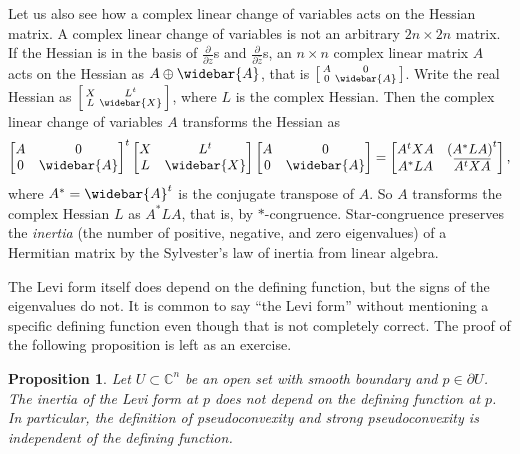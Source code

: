 \documentclass[12pt,openany]{book}
\newcommand{\C}{{\mathbb{C}}}
\newcommand{\myindex}[1]{#1\index{#1}}
\theoremstyle{plain}
\newtheorem{prop}[thm]{Proposition}
\theoremstyle{remark}
\theoremstyle{definition}
\theoremstyle{exercise}
\theoremstyle{example}
\begin{document}
Let us also see how a complex linear change of variables
acts on the Hessian matrix.  A complex linear change of variables is not an
arbitrary $2n \times 2n$ matrix.  If the Hessian is in the 
basis of $\frac{\partial}{\partial z}$s and
$\frac{\partial}{\partial \bar{z}}$s, an $n \times n$ complex linear matrix $A$
acts on the Hessian as $A \oplus \widebar{A}$, that is
$\left[ \begin{smallmatrix} A & 0 \\ 0 & \widebar{A} \end{smallmatrix}
\right]$.
Write the real Hessian as
$\left[ \begin{smallmatrix} X & L^t \\ L & \widebar{X} \end{smallmatrix}
\right]$, where $L$ is the complex Hessian.  Then the complex linear change
of variables $A$ transforms
the Hessian as
\begin{equation*}
{\begin{bmatrix} A & 0 \\ 0 & \widebar{A} \end{bmatrix}}^t
\begin{bmatrix} X & L^t \\ L & \widebar{X} \end{bmatrix}
\begin{bmatrix} A & 0 \\ 0 & \widebar{A} \end{bmatrix}
=
\begin{bmatrix} A^tXA & {(A^*LA)}^t \\ A^*LA & \overline{A^tXA} \end{bmatrix} ,
\end{equation*}
%
where $A^* = \widebar{A}^t$ is the conjugate
transpose of $A$.
So $A$
transforms the complex Hessian $L$ as $A^* L A$, that is, by $*$-congruence.
Star-congruence preserves the \emph{\myindex{inertia}}
(the number of positive, negative, and zero eigenvalues)
of a Hermitian matrix
by the Sylvester's law of inertia from linear algebra.

The Levi form itself does depend on the defining function, but the signs of
the eigenvalues do not.  It is common to say ``the
Levi form'' without mentioning a specific defining function
even though that is not completely correct.
The proof of the following proposition is left as an exercise.

\begin{prop} \label{prop:inertiainvariant}
Let $U \subset \C^n$ be an open set with smooth boundary and $p \in \partial
U$.  The inertia  of the Levi form at $p$
does not depend on the defining function at $p$.
In particular, the definition of pseudoconvexity and strong pseudoconvexity is
independent of the defining function.
\end{prop}
\end{document}
